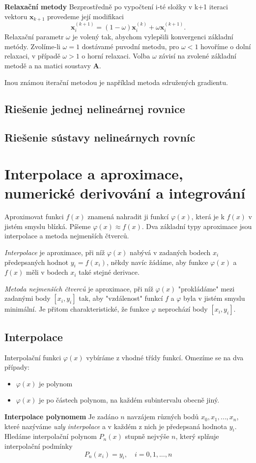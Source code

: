 \documentclass[a4]{report}
\theoremstyle{definition}
\begin{document}
{\textbf{Relaxační metody}\newline
Bezprostředně po vypočtení i-té složky v k+1 iteraci vektoru  $\textbf{x}_{k+1}$ provedeme její modifikaci $$\textbf{x}^{(k+1)}_i=(1-\omega)\textbf{x}^{(k)}_i+\omega\textbf{x}^{(k+1)}_i.$$
Relaxační parametr $\omega$ je volený tak, abychom vylepšili konvergenci základní metódy. Zvolíme-li $\omega=1$ dostávamé puvodní metodu, pro $\omega<1$ hovoříme o dolní relaxaci, v případě $\omega>1$ o horní relaxaci. Volba $\omega$ závisí na zvolené základní metodě a na matici soustavy $\textbf{A}$.

Inou známou iterační metodou je například metoda sdružených gradientu.
\subsection{Riešenie jednej nelineárnej rovnice}  
\subsection{Riešenie sústavy nelineárnych rovníc}  

\section{Interpolace a aproximace, numerické derivování a integrování}  

Aproximovat funkci $f(x)$ znamená nahradit ji funkcí $\varphi(x)$, která je k $f(x)$ v jistém smyslu blízká. Píšeme $\varphi(x)\approx f(x)$. Dva základní typy aproximace jsou interpolace a metoda nejmenších čtverců.

\textit{Interpolace} je aproximace, při níž $\varphi(x)$ nabývá v zadaných bodech $x_i$ předepsaných hodnot $y_i=f(x_i)$, někdy navíc žádáme, aby funkce $\varphi(x)$ a $f(x)$ měli v bodech $x_i$ také stejné derivace.

\textit{Metoda nejmenších čtverců} je aproximace, při níž $\varphi(x)$ "prokládáme" mezi zadanými body $[x_i,y_i]$ tak, aby "vzdálenost" funkcí $f$ a $\varphi$ byla v jistém smyslu minimální. Je přitom charakteristické, že funkce $\varphi$ neprochází body $[x_i,y_i]$.

\subsection{Interpolace}
Interpolační funkci $\varphi(x)$ vybíráme z vhodné třídy funkcí. Omezíme se na dva případy:
\begin{itemize}
\item  $\varphi(x)$ je polynom 
\item $\varphi(x)$ je po částech polynom, na každém subintervalu obecně jiný.
\end{itemize} 
\textbf{Interpolace polynomem}
Je zadáno $n$ navzájem různých bodů $x_0,x_1,...,x_n$, které nazýváme \textit{uzly interpolace} a v každém z nich je předepsaná hodnota $y_i$. Hledáme interpolační polynom $P_n(x)$ stupně nejvýše $n$, který splňuje interpolační podmínky $$P_n(x_i)=y_i,\quad i=0,1,...,n$$


}
\end{document}
